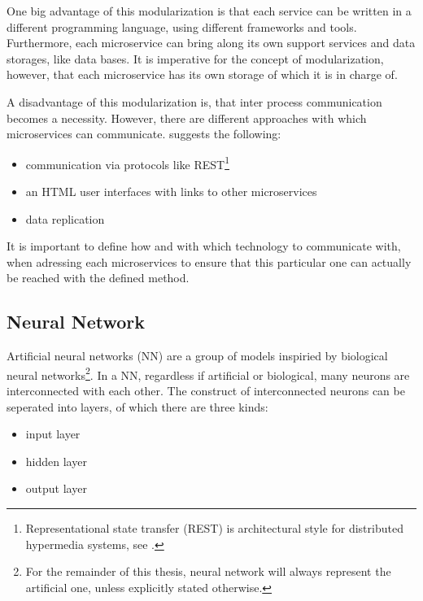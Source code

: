 One big advantage of this modularization is that each service can be written in a different programming language, using different frameworks and tools. Furthermore, each microservice can bring along its own support services and data storages, like data bases. It is imperative for the concept of modularization, however, that each microservice has its own storage of which it is in charge of.

A disadvantage of this modularization is, that inter process communication becomes a necessity. However, there are different approaches with which microservices can communicate. \cite{Wolff16} suggests the following:

\begin{itemize}
	\item communication via protocols like REST\footnote{Representational state transfer (REST) is architectural style for distributed hypermedia systems, see \cite{Fielding00}.}
	\item an HTML user interfaces with links to other microservices
	\item data replication
\end{itemize}

It is important to define how and with which technology to communicate with, when adressing each microservices to ensure that this particular one can actually be reached with the defined method.


\subsection{Neural Network}
Artificial neural networks (NN) are a group of models inspiried by biological neural networks\footnote{For the remainder of this thesis, neural network will always represent the artificial one, unless explicitly stated otherwise.}. In a NN, regardless if artificial or biological, many neurons are interconnected with each other. The construct of interconnected neurons can be seperated into layers, of which there are three kinds:

\begin{itemize}
	\item input layer
	\item hidden layer
	\item output layer
\end{itemize}


